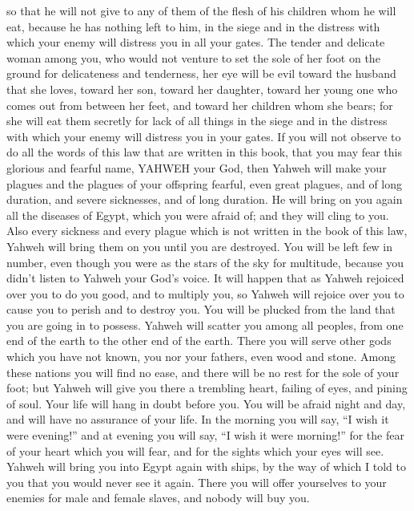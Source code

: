 {so that he will not give to any of them of the flesh of his children whom he will eat, because he has nothing left to him, in the siege and in the distress with which your enemy will distress you in all your gates.
The tender and delicate woman among you, who would not venture to set the sole of her foot on the ground for delicateness and tenderness, her eye will be evil toward the husband that she loves, toward her son, toward her daughter,
toward her young one who comes out from between her feet, and toward her children whom she bears; for she will eat them secretly for lack of all things in the siege and in the distress with which your enemy will distress you in your gates.
If you will not observe to do all the words of this law that are written in this book, that you may fear this glorious and fearful name, YAHWEH your God,
then Yahweh will make your plagues and the plagues of your offspring fearful, even great plagues, and of long duration, and severe sicknesses, and of long duration.
He will bring on you again all the diseases of Egypt, which you were afraid of; and they will cling to you.
Also every sickness and every plague which is not written in the book of this law, Yahweh will bring them on you until you are destroyed.
You will be left few in number, even though you were as the stars of the sky for multitude, because you didn’t listen to Yahweh your God’s voice.
It will happen that as Yahweh rejoiced over you to do you good, and to multiply you, so Yahweh will rejoice over you to cause you to perish and to destroy you. You will be plucked from the land that you are going in to possess.
Yahweh will scatter you among all peoples, from one end of the earth to the other end of the earth. There you will serve other gods which you have not known, you nor your fathers, even wood and stone.
Among these nations you will find no ease, and there will be no rest for the sole of your foot; but Yahweh will give you there a trembling heart, failing of eyes, and pining of soul.
Your life will hang in doubt before you. You will be afraid night and day, and will have no assurance of your life.
In the morning you will say, “I wish it were evening!” and at evening you will say, “I wish it were morning!” for the fear of your heart which you will fear, and for the sights which your eyes will see.
Yahweh will bring you into Egypt again with ships, by the way of which I told to you that you would never see it again. There you will offer yourselves to your enemies for male and female slaves, and nobody will buy you.

}
